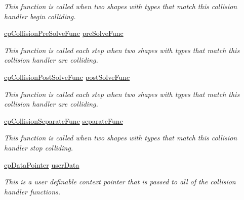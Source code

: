 \begin{DoxyCompactItemize}
\begin{DoxyCompactList}\small\item\em This function is called when two shapes with types that match this collision handler begin colliding. \end{DoxyCompactList}\item 
\hyperlink{group__cp_space_ga89b24d53d81a5a028198c3c2d3c39a9d}{cp\+Collision\+Pre\+Solve\+Func} \hyperlink{structcp_collision_handler_aff35bdeedae80600cbbb1a68682a7431}{pre\+Solve\+Func}
\begin{DoxyCompactList}\small\item\em This function is called each step when two shapes with types that match this collision handler are colliding. \end{DoxyCompactList}\item 
\hyperlink{group__cp_space_gaccb60bbb090c97823f49ee49e4e5d3c3}{cp\+Collision\+Post\+Solve\+Func} \hyperlink{structcp_collision_handler_adc3df1896d48519cc5359c51bd67ac98}{post\+Solve\+Func}
\begin{DoxyCompactList}\small\item\em This function is called each step when two shapes with types that match this collision handler are colliding. \end{DoxyCompactList}\item 
\hypertarget{structcp_collision_handler_a1823a67807ba11b1bae7f41024cd6ce0}{}\hyperlink{group__cp_space_ga01427ab634c483879cfed5bb22610487}{cp\+Collision\+Separate\+Func} \hyperlink{structcp_collision_handler_a1823a67807ba11b1bae7f41024cd6ce0}{separate\+Func}\label{structcp_collision_handler_a1823a67807ba11b1bae7f41024cd6ce0}

\begin{DoxyCompactList}\small\item\em This function is called when two shapes with types that match this collision handler stop colliding. \end{DoxyCompactList}\item 
\hypertarget{structcp_collision_handler_af2b874e87431e407a4045cb90d999b8a}{}\hyperlink{group__basic_types_ga2ac2c3c31e21893941f9e4f8ee279447}{cp\+Data\+Pointer} \hyperlink{structcp_collision_handler_af2b874e87431e407a4045cb90d999b8a}{user\+Data}\label{structcp_collision_handler_af2b874e87431e407a4045cb90d999b8a}

\begin{DoxyCompactList}\small\item\em This is a user definable context pointer that is passed to all of the collision handler functions. \end{DoxyCompactList}\end{DoxyCompactItemize}


